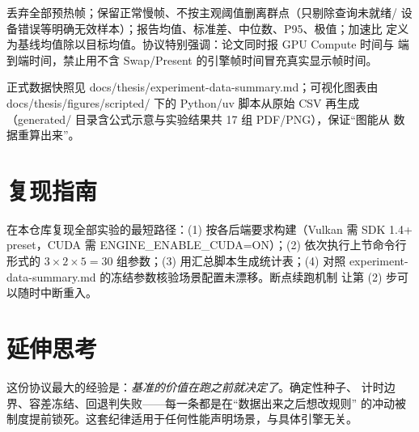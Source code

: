 丢弃全部预热帧；保留正常慢帧、不按主观阈值删离群点（只剔除查询未就绪/
设备错误等明确无效样本）；报告均值、标准差、中位数、P95、极值；加速比
定义为基线均值除以目标均值。协议特别强调：论文同时报 GPU Compute 时间与
端到端时间，禁止用不含 Swap/Present 的引擎帧时间冒充真实显示帧时间。

正式数据快照见 docs/thesis/experiment-data-summary.md；可视化图表由
docs/thesis/figures/scripted/ 下的 Python/uv 脚本从原始 CSV 再生成
（generated/ 目录含公式示意与实验结果共 17 组 PDF/PNG），保证``图能从
数据重算出来''。

\section{复现指南}

在本仓库复现全部实验的最短路径：(1) 按各后端要求构建（Vulkan 需 SDK
1.4+ preset，CUDA 需 ENGINE\_ENABLE\_CUDA=ON）；(2) 依次执行上节命令行
形式的 $3\times2\times5=30$ 组参数；(3) 用汇总脚本生成统计表；(4) 对照
experiment-data-summary.md 的冻结参数核验场景配置未漂移。断点续跑机制
让第 (2) 步可以随时中断重入。

\section{延伸思考}

这份协议最大的经验是：\emph{基准的价值在跑之前就决定了}。确定性种子、
计时边界、容差冻结、回退判失败——每一条都是在``数据出来之后想改规则''
的冲动被制度提前锁死。这套纪律适用于任何性能声明场景，与具体引擎无关。
